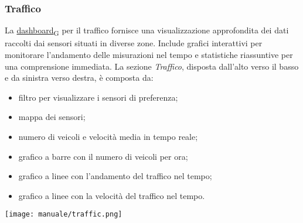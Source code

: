 \subsubsection{Traffico}
La \href{https://7last.github.io/docs/pb/documentazione-interna/glossario\#dashboard}{dashboard\textsubscript{G}} per il traffico fornisce una visualizzazione approfondita dei dati raccolti dai sensori situati in diverse zone. Include grafici interattivi per monitorare l'andamento delle misurazioni nel tempo e statistiche riassuntive per una comprensione immediata. La sezione \textit{Traffico}, disposta dall'alto verso il basso e da sinistra verso destra, è composta da:
\begin{itemize}
    \item filtro per visualizzare i sensori di preferenza;
    \item mappa dei sensori;
    \item numero di veicoli e velocità media in tempo reale;
    \item grafico a barre con il numero di veicoli per ora;
    \item grafico a linee con l'andamento del traffico nel tempo;
    \item grafico a linee con la velocità del traffico nel tempo.
\end{itemize}
\begin{center}
    \texttt{[image: manuale/traffic.png]}
\end{center}




